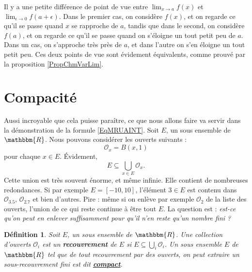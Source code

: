\documentclass[a4paper,12pt]{book}
\newcommand{\eR}{\mathbbm{R}}
\newcounter{numtho}
\theoremstyle{mes_exemples}	\newtheorem{exemple}[numtho]{Exemple}
\theoremstyle{mes_tho}
\newtheorem{definition}[numtho]{Définition}
\newcommand{\defe}[2]{\textbf{#1}\index{#2}}
\newcommand{\mO}{\mathcal{O}}
\begin{document}
Il y a une petite différence de point de vue entre $\lim_{x\to a}f(x)$ et $\lim_{\epsilon\to 0}f(a+\epsilon)$. Dans le premier cas, on considère $f(x)$, et on regarde ce qu'il se passe quand $x$ se rapproche de $a$, tandis que dans le second, on considère $f(a)$, et on regarde ce qu'il se passe quand on s'éloigne un tout petit peu de $a$. Dans un cas, on s'approche très près de $a$, et dans l'autre on s'en éloigne un tout petit peu. Ces deux points de vue sont évidement équivalents, comme prouvé par la proposition \ref{PropChmVarLim}.



					\section{Compacité}

Aussi incroyable que cela puisse paraître, ce que nous allons faire va servir dans la démonstration de la formule \eqref{EqMRUAINT}. Soit $E$, un sous ensemble de $\eR$. Nous pouvons considérer les ouverts suivants : 
\begin{equation}
	\mO_x=B(x,1)
\end{equation}
pour chaque $x\in E$. Évidement,
\begin{equation}
	E\subseteq \bigcup_{x\in E}\mO_x.
\end{equation}
Cette union est très souvent énorme, et même infinie. Elle contient de nombreuses redondances. Si par exemple $E=[-10,10]$, l'élément $3\in E$ est contenu dans $\mO_{3.5}$, $\mO_{2.7}$ et bien d'autres. Pire : même si on enlève par exemple $\mO_2$ de la liste des ouverts, l'union de ce qui reste continue à être tout $E$. La question est : \emph{est-ce qu'on peut en enlever suffisamment pour qu'il n'en reste qu'un nombre fini ?}
\begin{definition}
Soit $E$, un sous ensemble de $\eR$. Une collection d'ouverts $\mO_i$ est un \defe{recouvrement}{Recouvrement} de $E$ si $E\subseteq \bigcup_{i}\mO_i$. Un sous ensemble $E$ de $\eR$ tel que de tout recouvrement par des ouverts, on peut extraire un sous-recouvrement fini est dit \defe{\href{http://fr.wikipedia.org/wiki/Espace_compact}{compact}}{Compact}.
\end{definition}
\end{document}
